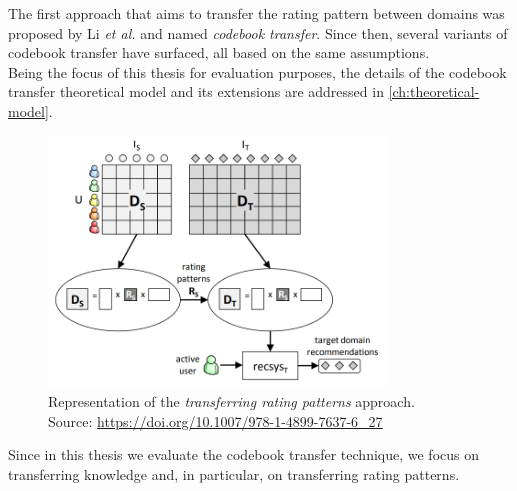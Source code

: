 \begin{itemize}
\begin{itemize}
The first approach that aims to transfer the rating pattern between domains was proposed by Li \textit{et al.} \cite{10.5555/1661445.1661773} and named \textit{codebook transfer}. Since then, several variants of codebook transfer have surfaced, all based on the same assumptions.\\
Being the focus of this thesis for evaluation purposes, the details of the codebook transfer theoretical model and its extensions are addressed in \autoref{ch:theoretical-model}.
\begin{figure}[hbt]
\centering
\includegraphics[width=0.8\textwidth]{pictures/transferring-rating-patterns}
\caption{Representation of the \textit{transferring rating patterns} approach.\\
Source: \url{https://doi.org/10.1007/978-1-4899-7637-6\_27}}
\end{figure}
\end{itemize}
\end{itemize}
Since in this thesis we evaluate the codebook transfer technique, we focus on transferring knowledge and, in particular, on transferring rating patterns.
